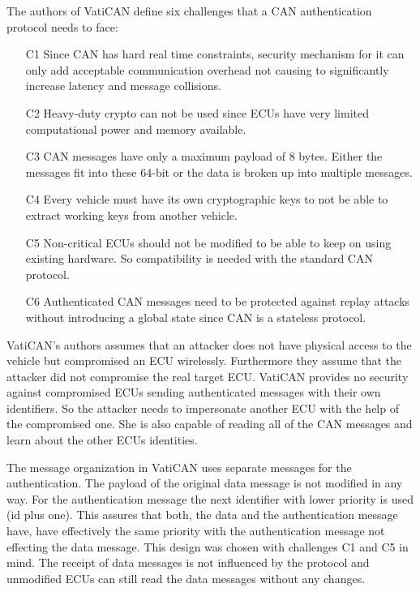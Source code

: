 The authors of VatiCAN define six challenges that a CAN authentication protocol
needs to face:

\begin{enumerate}
    \item[C1] Since CAN has hard real time constraints, security mechanism for
    it can only add acceptable communication overhead not causing to
    significantly increase latency and message collisions. 
    \item[C2] Heavy-duty crypto can not be used since ECUs have very limited
    computational power and memory available.
    \item[C3] CAN messages have only a maximum payload of 8 bytes. Either the
    messages fit into these 64-bit or the data is broken up into multiple
    messages.
    \item[C4] Every vehicle must have its own cryptographic keys to not be able
    to extract working keys from another vehicle.
    \item[C5] Non-critical ECUs should not be modified to be able to keep on
    using existing hardware. So compatibility is needed with the standard CAN
    protocol.
    \item[C6] Authenticated CAN messages need to be protected against replay
    attacks without introducing a global state since CAN is a stateless
    protocol.
\end{enumerate}

VatiCAN's authors assumes that an attacker does not have physical access to the vehicle but compromised an ECU wirelessly. Furthermore they assume that the attacker did not compromise the real target ECU\@. VatiCAN provides no security against compromised ECUs sending authenticated messages with their own identifiers. So the attacker needs to impersonate another ECU with the help of the compromised one. She is also capable of reading all of the CAN messages and learn about the other ECUs identities.

The message organization in VatiCAN uses separate messages for the authentication. The payload of the original data message is not modified in any way. For the authentication message the next identifier with lower priority is used (id plus one). This assures that both, the data and the authentication message have, have effectively the same priority with the authentication message not effecting the data message. This design was chosen with challenges C1 and C5 in mind. The receipt of data messages is not influenced by the protocol and unmodified ECUs can still read the data messages without any changes.

